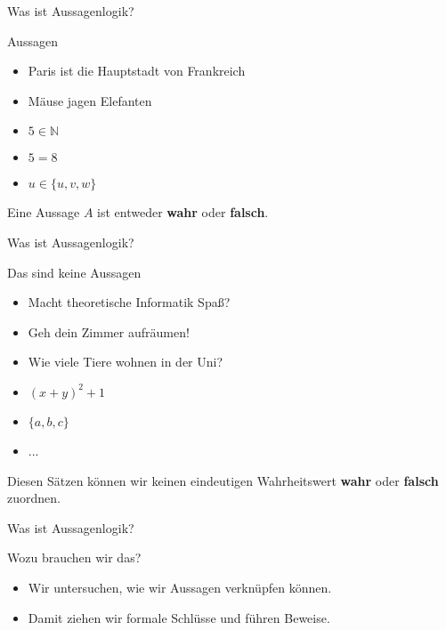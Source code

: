 \begin{frame}[fragile]{Was ist Aussagenlogik?}
    \begin{alertblock}{Aussagen}
    \begin{itemize}
        \item Paris ist die Hauptstadt von Frankreich
        \item Mäuse jagen Elefanten
        \item $5 \in \mathbb{N}$
        \item $5 = 8$
        \item $u \in \{u, v, w\}$
    \end{itemize}
    \end{alertblock}
    Eine Aussage $A$ ist entweder \textbf{wahr} oder \textbf{falsch}.
\end{frame}

\begin{frame}[fragile]{Was ist Aussagenlogik?}
    \begin{alertblock}{Das sind keine Aussagen}
    \begin{itemize}
        \item Macht theoretische Informatik Spaß?
        \item Geh dein Zimmer aufräumen!
        \item Wie viele Tiere wohnen in der Uni?
        \item $(x+y)^2+1$
        \item $\{a,b,c\}$
        \item ...
    \end{itemize}
    \end{alertblock}
    Diesen Sätzen können wir keinen eindeutigen Wahrheitswert \textbf{wahr} oder \textbf{falsch} zuordnen.
\end{frame}

\begin{frame}[fragile]{Was ist Aussagenlogik?}
    \begin{alertblock}{Wozu brauchen wir das?}
    \begin{itemize}
        \item Wir untersuchen, wie wir Aussagen verknüpfen können.
        \item Damit ziehen wir formale Schlüsse und führen Beweise.
    \end{itemize}
    \end{alertblock}
\end{frame}

